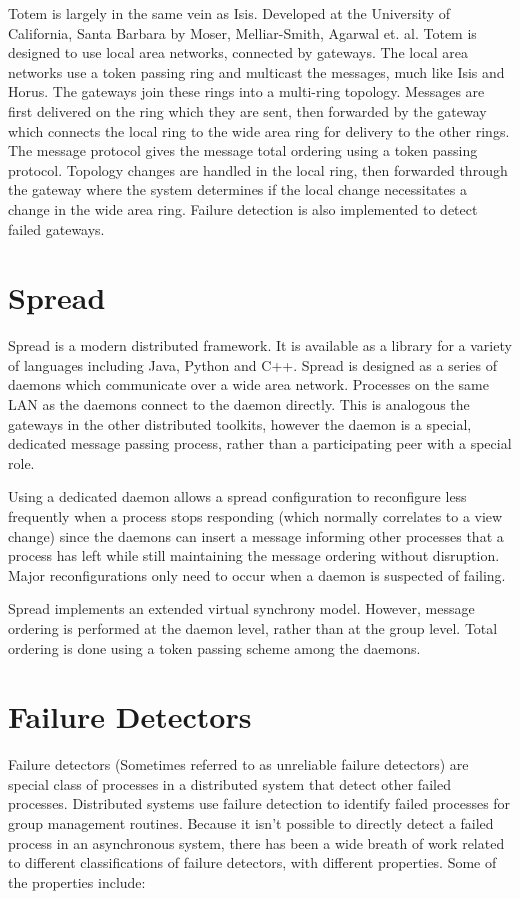 Totem is largely in the same vein as Isis. Developed at the University of
California, Santa Barbara by Moser, Melliar-Smith, Agarwal et. al. Totem is
designed to use local area networks, connected by gateways. The local area
networks use a token passing ring and multicast the messages, much like Isis
and Horus. The gateways join these rings into a multi-ring topology. Messages
are first delivered on the ring which they are sent, then forwarded by the
gateway which connects the local ring to the wide area ring for delivery to
the other rings. The message protocol gives the message total ordering using a
token passing protocol. Topology changes are handled in the local ring, then
forwarded through the gateway where the system determines if the local change
necessitates a change in the wide area ring. Failure detection is also implemented
to detect failed gateways.

\section{Spread}

Spread is a modern distributed framework. It is available as a library for a
variety of languages including Java, Python and C++. Spread is designed as a
series of daemons which communicate over a wide area network. Processes on the
same LAN as the daemons connect to the daemon directly. This is analogous the
gateways in the other distributed toolkits, however the daemon is a special,
dedicated message passing process, rather than a participating peer with a
special role.

Using a dedicated daemon allows a spread configuration to reconfigure less
frequently when a process stops responding (which normally correlates to a
view change) since the daemons can insert a message informing other processes
that a process has left while still maintaining the message ordering without
disruption. Major reconfigurations only need to occur when a daemon is
suspected of failing.

Spread implements an extended virtual synchrony model. However, message
ordering is performed at the daemon level, rather than at the group level.
Total ordering is done using a token passing scheme among the daemons.

\section{Failure Detectors}

Failure detectors (Sometimes referred to as unreliable failure detectors)
 are special class of processes in a distributed system that
detect other failed processes. Distributed systems use failure detection to
identify failed processes for group management routines. Because it isn't
possible to directly detect a failed process in an asynchronous system, there
has been a wide breath of work related to different classifications of failure
detectors, with different properties. Some of the properties include:

